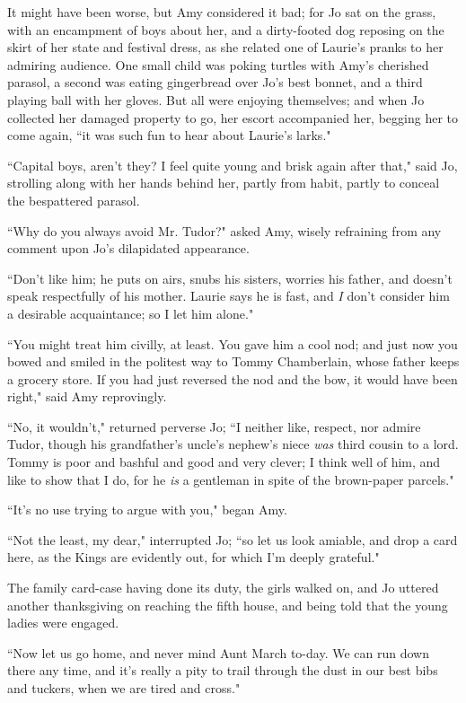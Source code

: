 It might have been worse, but Amy considered it bad; for Jo sat on the
grass, with an encampment of boys about her, and a dirty-footed dog
reposing on the skirt of her state and festival dress, as she related
one of Laurie's pranks to her admiring audience. One
small child was poking turtles with Amy's cherished
parasol, a second was eating gingerbread over Jo's best
bonnet, and a third playing ball with her gloves. But all were enjoying
themselves; and when Jo collected her damaged property to go, her escort
accompanied her, begging her to come again, ``it was such fun to hear
about Laurie's larks."

``Capital boys, aren't they? I feel quite young and brisk
again after that," said Jo, strolling along with her hands behind her,
partly from habit, partly to conceal the bespattered parasol.

``Why do you always avoid Mr. Tudor?" asked Amy, wisely refraining from
any comment upon Jo's dilapidated appearance.

``Don't like him; he puts on airs, snubs his sisters,
worries his father, and doesn't speak respectfully of
his mother. Laurie says he is fast, and \emph{I} don't
consider him a desirable acquaintance; so I let him alone."

``You might treat him civilly, at least. You gave him a cool nod; and
just now you bowed and smiled in the politest way to Tommy Chamberlain,
whose father keeps a grocery store. If you had just reversed the nod and
the bow, it would have been right," said Amy reprovingly.

``No, it wouldn't," returned perverse Jo; ``I neither
like, respect, nor admire Tudor, though his
grandfather's uncle's
nephew's niece \emph{was} third cousin to a lord. Tommy
is poor and bashful and good and very clever; I think well of him, and
like to show that I do, for he \emph{is} a gentleman in spite of the
brown-paper parcels."

``It's no use trying to argue with you," began Amy.

``Not the least, my dear," interrupted Jo; ``so let us look amiable, and
drop a card here, as the Kings are evidently out, for which
I'm deeply grateful."

The family card-case having done its duty, the girls walked on, and Jo
uttered another thanksgiving on reaching the fifth house, and being told
that the young ladies were engaged.

``Now let us go home, and never mind Aunt March to-day. We can run down
there any time, and it's really a pity to trail through
the dust in our best bibs and tuckers, when we are tired and cross."

